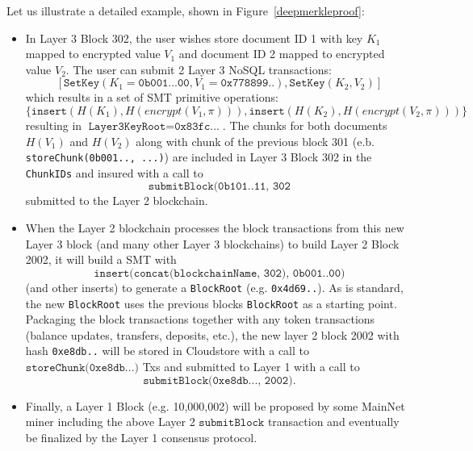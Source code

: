\documentclass{article}
\newcommand{\databaseencryptionkey}{\pi}
\newcommand{\hash}[1]{H(#1)}
\newcommand{\encrypt}[1]{encrypt(#1, \databaseencryptionkey)}
\begin{document}
Let us illustrate a detailed example, shown in Figure~\ref{deepmerkleproof}:
\begin{itemize}
\item In Layer 3 Block 302, the user wishes store document ID 1 with key $K_1$ mapped to encrypted value $V_1$ and document ID 2 mapped to encrypted value $V_2$. The user can submit 2 Layer 3 NoSQL transactions:
\begin{equation*}
\left[ \texttt{SetKey}(K_1=\texttt{0b001...00},V_1=\texttt{0x778899..}),
\texttt{SetKey}(K_2, V_2)
\right]
\end{equation*}
\noindent which results in a set of SMT primitive operations:
\begin{equation*}
\{\texttt{insert}(\hash{K_1},\hash{\encrypt{V_1}}),  \texttt{insert}(\hash{K_2},\hash{\encrypt{V_2}}) \}
\end{equation*}
resulting in
$\texttt{Layer3KeyRoot}=\texttt{0x83fc...}$.  The chunks for both documents $H(V_1)$ and $H(V_2)$ along with chunk of the previous block 301  (e.b. \texttt{storeChunk(0b001.., ...)}) are included in Layer 3 Block 302 in the \texttt{ChunkIDs} and insured with a call to \[
\texttt{submitBlock(0b101..11, 302}
\]
submitted to the Layer 2 blockchain.

\item When the Layer 2 blockchain processes the block transactions from this new Layer 3 block (and many other Layer 3 blockchains) to build Layer 2 Block 2002, it will build a SMT with
\[
\texttt{insert(concat(blockchainName, 302), 0b001..00)}
\]
(and other inserts) to generate a \texttt{BlockRoot} (e.g. \texttt{0x4d69..}).  As is standard, the new \texttt{BlockRoot} uses the previous blocks \texttt{BlockRoot} as a starting point.  Packaging the block transactions together with any token transactions (balance updates, transfers, deposits, etc.), the new layer 2 block 2002 with hash \texttt{0xe8db..} will be stored in Cloudstore with a call to $\texttt{storeChunk(0xe8db...)}$
Txs and submitted to Layer 1 with a call to
\[
\texttt{submitBlock(0xe8db..., 2002)}.
\]
\item Finally, a Layer 1 Block (e.g. 10,000,002) will be proposed by some MainNet miner including the above Layer 2 $\texttt{submitBlock}$ transaction and eventually be finalized by the Layer 1 consensus protocol.
\end{itemize}
\end{document}
